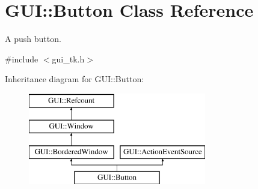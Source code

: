 \hypertarget{classGUI_1_1Button}{\section{G\-U\-I\-:\-:Button Class Reference}
\label{classGUI_1_1Button}
}


A push button.  




{\ttfamily \#include $<$gui\-\_\-tk.\-h$>$}

Inheritance diagram for G\-U\-I\-:\-:Button\-:\begin{figure}[H]
\begin{center}
\leavevmode
\includegraphics[height=4.000000cm]{classGUI_1_1Button}
\end{center}
\end{figure}
